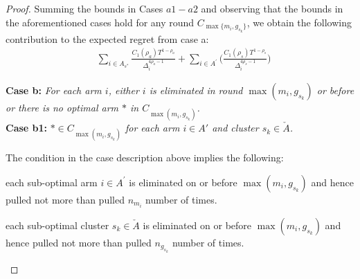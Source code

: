 \begin{proof}
Summing the bounds in Cases $a1-a2$ and observing that the bounds in the aforementioned cases hold for any round $C_{\max \lbrace m_i,g_{s_k}\rbrace}$, we obtain the following contribution to the expected regret from case a:
\begin{align*}
&\sum_{i\in A_{s^*}} \frac{C_{1}(\rho_{a})T^{1-\rho_{a}}}{\Delta_{i}^{4\rho_{a}-1}} + \sum_{i\in A^{'}}\bigg(\frac{C_{1}(\rho_{s})T^{1-\rho_{s}}}{\Delta_{i}^{4\rho_{s}-1}}\bigg)
\end{align*}


\textbf{Case b:} \textit{For each arm $i$, either ${i}$ is eliminated in round $\max (m_{i},g_{s_{k}})$ or before or there is no optimal arm ${*}$ in $C_{\max(m_{i},g_{s_{k}})}$.} \\

\textbf{Case b1:} \textit{${*}\in C_{\max(m_{i},g_{s_{k}})}$ for each arm $i \in A'$ and cluster $s_k \in \check A$.} 


The condition in the case description above implies the following: \\
\begin{inparaenum}[\bfseries (i)]
\item each sub-optimal arm ${i}\in A^{'}$ is  eliminated on or before $\max (m_{i},g_{s_{k}})$ and hence  pulled not more than pulled $n_{m_{i}}$ number of times.\\
\item each sub-optimal cluster $s_k \in \check A$ is  eliminated on or before $\max (m_{i},g_{s_{k}})$ and hence  pulled not more than pulled $n_{g_{s_{k}}}$ number of times.
\end{inparaenum}


\end{proof}
